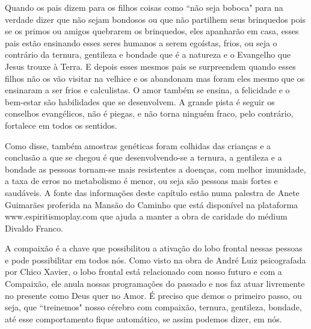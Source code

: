 \emdash{}Quando os pais dizem para os filhos coisas como ``não seja boboca" para na verdade dizer que não sejam bondosos ou que não partilhem seus brinquedos pois se os primos ou amigos quebrarem os brinquedos, eles apanharão em casa, esses pais estão ensinando esses seres humanos a serem egoístas, frios, ou seja o contrário da ternura, gentileza e bondade que é a natureza e o Evangelho que Jesus trouxe à Terra. E depois esses mesmos pais se surpreendem quando esses filhos não os vão visitar na velhice e os abandonam mas foram eles mesmo que os ensinaram a ser frios e calculistas. O amor também se ensina, a felicidade e o bem-estar são habilidades que se desenvolvem. A grande pista é seguir os conselhos evangélicos, não é piegas, e não torna ninguém fraco, pelo contrário, fortalece em todos os sentidos.

\emdash{}Como disse, também amostras genéticas foram colhidas das crianças e a conclusão a que se chegou é que desenvolvendo-se a ternura, a gentileza e a bondade as pessoas tornam-se mais resistentes a doenças, com melhor imunidade, a taxa de erros no metabolismo é menor, ou seja são pessoas mais fortes e saudáveis. A fonte das informações deste capítulo estão numa palestra de Anete Guimarães proferida na Mansão do Caminho que está disponível na plataforma www.espiritismoplay.com que ajuda a manter a obra de caridade do médium Divaldo Franco.

\emdash{}A compaixão é a chave que possibilitou a ativação do lobo frontal nessas pessoas e pode possibilitar em todos nós. Como visto na obra de André Luiz psicografada por Chico Xavier, o lobo frontal está relacionado com nosso futuro e com a Compaixão, ele anula nossas programações do passado e nos faz atuar livremente no presente como Deus quer no Amor. É preciso que demos o primeiro passo, ou seja, que ``treinemos" nosso cérebro com compaixão, ternura, gentileza, bondade, até esse comportamento fique automático, se assim podemos dizer, em nós.